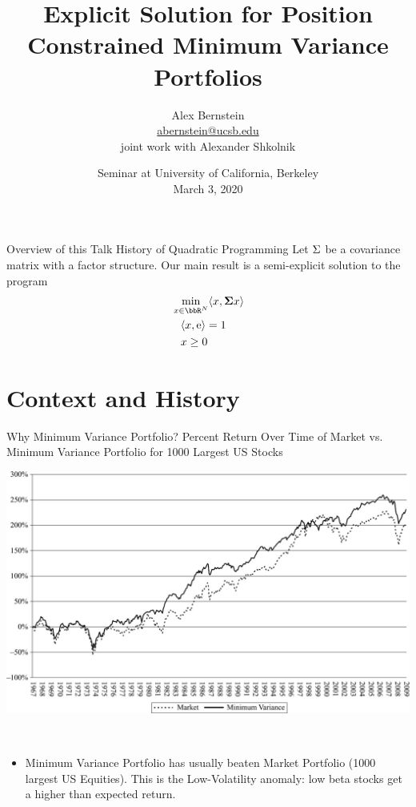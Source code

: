 \documentclass[11pt,leqno]{beamer}
\title{Explicit Solution for Position Constrained 
Minimum Variance Portfolios}
\date{Seminar at University of California, Berkeley\\March 3, 2020}
\author{Alex Bernstein\\
\url{abernstein@ucsb.edu}\\
joint work with Alexander Shkolnik \\ 
}
\institute{
{\it Department of Statistics \& Applied Probability } \\
University of California, Santa Barbara
}
\begin{document}
\ifxetex
  \let\lsum\sum
  \renewcommand{\sum}{\bm{\lsum}}

  \let\lprod\prod
  \renewcommand{\prod}{\bm{\lprod}}
\else
\fi




\begin{frame}
\maketitle
\end{frame}

\newcommand{\af}{Y}
\newcommand{\df}{X}

\begin{frame}{Overview of this Talk}
History of Quadratic Programming
Let $\Sigma$ be a covariance matrix with a factor structure.  Our main result is a semi-explicit solution to the program
 \begin{align*} 
&\min_{x \in \bbR^{\nv}} \prj{x}{ \bsig x}
  \\ &\hspace{8pt} \prj{x}{\rme} = 1 
  \\ &\hspace{8pt} x \ge  0
\end{align*}

\end{frame}

\section{Context and History}
\begin{frame}{Why Minimum Variance Portfolio?}
Percent Return Over Time of Market vs. Minimum Variance Portfolio  for 1000 Largest US Stocks 
\begin{centering}
\includegraphics[scale=0.5]{CDPic.jpg}\\
\cite{clarke2011}
\end{centering}\\
\begin{itemize}
\item Minimum Variance Portfolio has usually beaten Market Portfolio (1000 largest US Equities).  This is the Low-Volatility anomaly: low beta stocks get a higher than expected return.
\end{itemize}
\end{frame}
\end{document}

